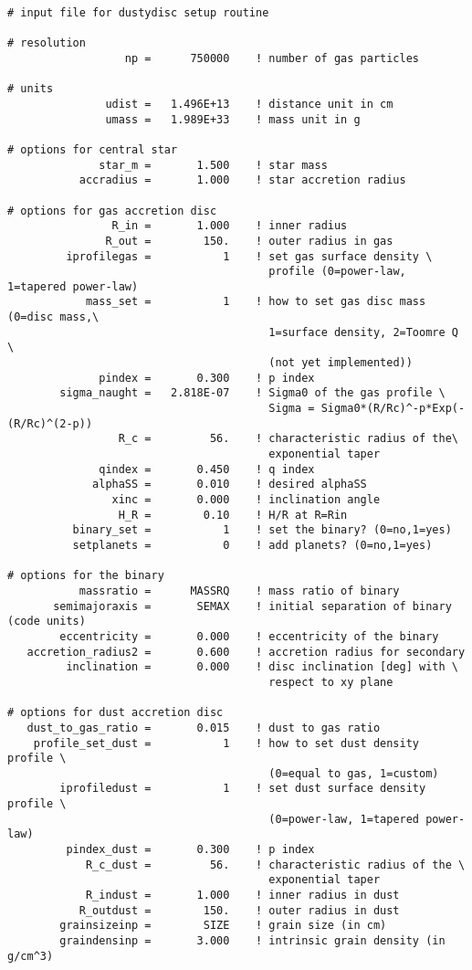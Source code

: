 \documentclass[10pt,a4paper,twoside]{article} %
\begin{document}
\begin{verbatim}
# input file for dustydisc setup routine

# resolution
                  np =      750000    ! number of gas particles

# units
               udist =   1.496E+13    ! distance unit in cm
               umass =   1.989E+33    ! mass unit in g

# options for central star
              star_m =       1.500    ! star mass
           accradius =       1.000    ! star accretion radius

# options for gas accretion disc
                R_in =       1.000    ! inner radius
               R_out =        150.    ! outer radius in gas
         iprofilegas =           1    ! set gas surface density \
                                        profile (0=power-law, 1=tapered power-law)
            mass_set =           1    ! how to set gas disc mass (0=disc mass,\
                                        1=surface density, 2=Toomre Q \
                                        (not yet implemented))
              pindex =       0.300    ! p index
        sigma_naught =   2.818E-07    ! Sigma0 of the gas profile \
                                        Sigma = Sigma0*(R/Rc)^-p*Exp(-(R/Rc)^(2-p))
                 R_c =         56.    ! characteristic radius of the\
                                        exponential taper
              qindex =       0.450    ! q index
             alphaSS =       0.010    ! desired alphaSS
                xinc =       0.000    ! inclination angle
                 H_R =        0.10    ! H/R at R=Rin
          binary_set =           1    ! set the binary? (0=no,1=yes)
          setplanets =           0    ! add planets? (0=no,1=yes)

# options for the binary
           massratio =      MASSRQ    ! mass ratio of binary
       semimajoraxis =       SEMAX    ! initial separation of binary (code units)
        eccentricity =       0.000    ! eccentricity of the binary
   accretion_radius2 =       0.600    ! accretion radius for secondary
         inclination =       0.000    ! disc inclination [deg] with \
                                        respect to xy plane

# options for dust accretion disc
   dust_to_gas_ratio =       0.015    ! dust to gas ratio
    profile_set_dust =           1    ! how to set dust density profile \
                                        (0=equal to gas, 1=custom)
        iprofiledust =           1    ! set dust surface density profile \
                                        (0=power-law, 1=tapered power-law)
         pindex_dust =       0.300    ! p index
            R_c_dust =         56.    ! characteristic radius of the \
                                        exponential taper
            R_indust =       1.000    ! inner radius in dust
           R_outdust =        150.    ! outer radius in dust
        grainsizeinp =        SIZE    ! grain size (in cm)
        graindensinp =       3.000    ! intrinsic grain density (in g/cm^3)
\end{verbatim}

\nocite{*}

\end{document}
